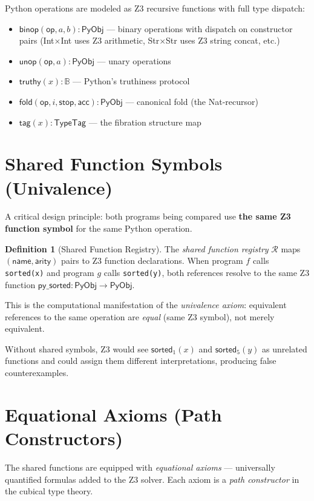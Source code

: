 \documentclass[11pt,a4paper]{report}
\theoremstyle{definition}
\newtheorem{definition}{Definition}[chapter]
\theoremstyle{plain}
\newcommand{\Bool}{\mathbb{B}}
\newcommand{\PyObj}{\mathsf{PyObj}}
\newcommand{\fold}{\mathsf{fold}}
\newcommand{\op}{\mathsf{op}}
\begin{document}
Python operations are modeled as Z3 recursive functions with full
type dispatch:

\begin{itemize}
  \item $\mathsf{binop}(\op, a, b) : \PyObj$ --- binary operations
    with dispatch on constructor pairs (Int$\times$Int uses Z3
    arithmetic, Str$\times$Str uses Z3 string concat, etc.)
  \item $\mathsf{unop}(\op, a) : \PyObj$ --- unary operations
  \item $\mathsf{truthy}(x) : \Bool$ --- Python's truthiness protocol
  \item $\fold(\op, i, \mathsf{stop}, \mathsf{acc}) : \PyObj$ ---
    canonical fold (the Nat-recursor)
  \item $\mathsf{tag}(x) : \mathsf{TypeTag}$ --- the fibration
    structure map
\end{itemize}

\section{Shared Function Symbols (Univalence)}

A critical design principle: both programs being compared use
\textbf{the same Z3 function symbol} for the same Python operation.

\begin{definition}[Shared Function Registry]
The \emph{shared function registry} $\mathcal{R}$ maps
$(\mathsf{name}, \mathsf{arity})$ pairs to Z3 function declarations.
When program $f$ calls \texttt{sorted(x)} and program $g$ calls
\texttt{sorted(y)}, both references resolve to the same Z3 function
$\mathsf{py\_sorted} : \PyObj \to \PyObj$.
\end{definition}

This is the computational manifestation of the \emph{univalence axiom}:
equivalent references to the same operation are \emph{equal} (same Z3
symbol), not merely equivalent.

Without shared symbols, Z3 would see $\mathsf{sorted}_1(x)$ and
$\mathsf{sorted}_5(y)$ as unrelated functions and could assign them
different interpretations, producing false counterexamples.

\section{Equational Axioms (Path Constructors)}

The shared functions are equipped with \emph{equational axioms} ---
universally quantified formulas added to the Z3 solver.  Each axiom
is a \emph{path constructor} in the cubical type theory.
\end{document}
